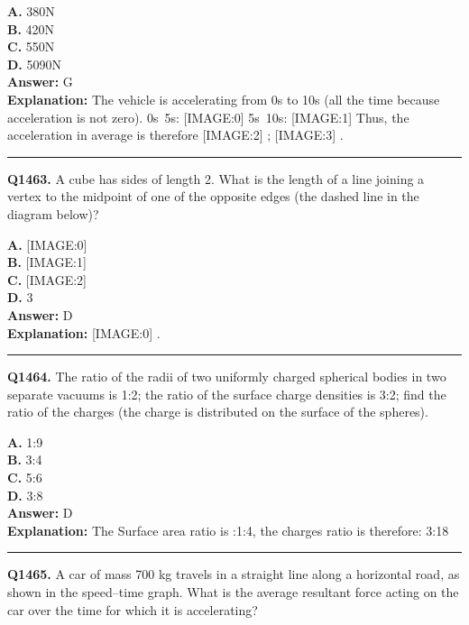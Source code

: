 \documentclass[12pt]{article}
\begin{document}
\textbf{A.} 380N \\
\textbf{B.} 420N \\
\textbf{C.} 550N \\
\textbf{D.} 5090N \\

\textbf{Answer:} G \\
\textbf{Explanation:} The vehicle is accelerating from 0s to 10s (all the time because acceleration is not zero).
0s~5s:
[IMAGE:0]
5s~10s:
[IMAGE:1]
Thus, the acceleration in average is therefore
[IMAGE:2]
;
[IMAGE:3]
.

\hrule
\vspace{1em}


\noindent
\textbf{Q1463.} A cube has sides of length 2. What is the length of a line joining a vertex to the midpoint of one of the opposite edges (the dashed line in the diagram below)?



\textbf{A.} [IMAGE:0] \\
\textbf{B.} [IMAGE:1] \\
\textbf{C.} [IMAGE:2] \\
\textbf{D.} 3 \\

\textbf{Answer:} D \\
\textbf{Explanation:} [IMAGE:0]
.

\hrule
\vspace{1em}


\noindent
\textbf{Q1464.} The ratio of the radii of two uniformly charged spherical bodies in two separate vacuums is 1:2; the ratio of the surface charge densities is 3:2; find the ratio of the charges (the charge is distributed on the surface of the spheres).



\textbf{A.} 1:9 \\
\textbf{B.} 3:4 \\
\textbf{C.} 5:6 \\
\textbf{D.} 3:8 \\

\textbf{Answer:} D \\
\textbf{Explanation:} The Surface area ratio is :1:4, the charges ratio is therefore: 3:18

\hrule
\vspace{1em}


\noindent
\textbf{Q1465.} A car of mass 700 kg travels in a straight line along a horizontal road, as shown in the speed–time graph.
What is the average resultant force acting on the car over the time for which it is accelerating?
\end{document}
